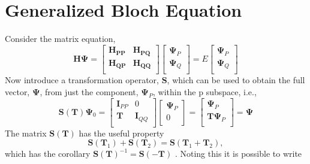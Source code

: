 \section{Generalized Bloch Equation } 
Consider the matrix equation,
\begin{equation}
\mathbf{H}\boldsymbol{\Psi} =
\begin{bmatrix}
 \mathbf{H_{PP}} & \mathbf{H_{PQ}} \\ 
 \mathbf{H_{QP}} & \mathbf{H_{QQ}} \\ 
\end{bmatrix} 
\begin{bmatrix}
 \boldsymbol{\Psi}_{P} \\ 
 \boldsymbol{\Psi}_{Q} \\ 
\end{bmatrix} 
= E 
\begin{bmatrix}
 \boldsymbol{\Psi}_{P} \\ 
 \boldsymbol{\Psi}_{Q} \\ 
\end{bmatrix} 
\end{equation}
Now introduce a transformation operator, $\mathbf{S}$, which can be used to obtain the full 
vector, $\boldsymbol{\Psi}$, from just the component, $\boldsymbol{\Psi}_{P}$, within the $\mathrm{p}$ subspace, i.e.,
\begin{equation}
\mathbf{S}(\mathbf{T})\boldsymbol{\Psi}_{0}= 
\begin{bmatrix}
\mathbf{I}_{PP} & 0 \\ 
\mathbf{T} & \mathbf{I}_{QQ} \\ 
\end{bmatrix}
\begin{bmatrix}
\boldsymbol{\Psi}_{P} \\ 
0 \\ 
\end{bmatrix}=  
\begin{bmatrix}
\boldsymbol{\Psi}_{P} \\ 
\mathbf{T}\boldsymbol{\Psi}_{P} \\ 
\end{bmatrix} 
= \boldsymbol{\Psi}
\end{equation}
The matrix $\mathbf{S}(\mathbf{T})$ has the useful property
\begin{equation}
\mathbf{S}(\mathbf{T}_{1})+ \mathbf{S}(\mathbf{T}_{2})=\mathbf{S}(\mathbf{T}_{1}+\mathbf{T}_{2}),
\end{equation}
which has the corollary  $\mathbf{S}(\mathbf{T})^{-1}=\mathbf{S}(-\mathbf{T})$ . Noting this it is possible to write
